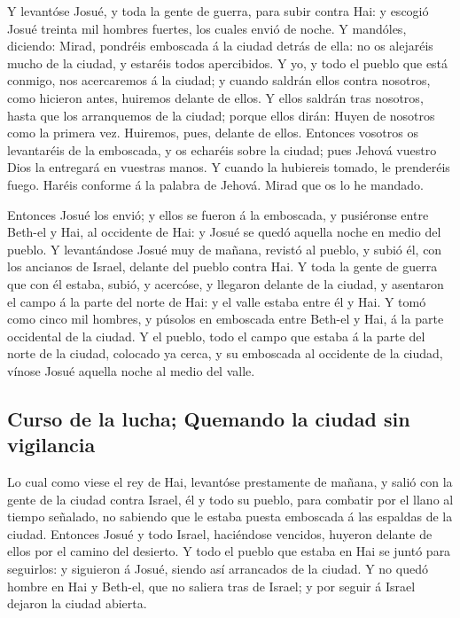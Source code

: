  Y levantóse Josué, y toda la gente de guerra, para subir
contra Hai: y escogió Josué treinta mil hombres fuertes, los cuales
envió de noche.  Y mandóles, diciendo: Mirad, pondréis
emboscada á la ciudad detrás de ella: no os alejaréis mucho de la
ciudad, y estaréis todos apercibidos.  Y yo, y todo el
pueblo que está conmigo, nos acercaremos á la ciudad; y cuando saldrán
ellos contra nosotros, como hicieron antes, huiremos delante de ellos.
 Y ellos saldrán tras nosotros, hasta que los arranquemos
de la ciudad; porque ellos dirán: Huyen de nosotros como la primera vez.
Huiremos, pues, delante de ellos.  Entonces vosotros os
levantaréis de la emboscada, y os echaréis sobre la ciudad; pues Jehová
vuestro Dios la entregará en vuestras manos.  Y cuando la
hubiereis tomado, le prenderéis fuego. Haréis conforme á la palabra de
Jehová. Mirad que os lo he mandado.

 Entonces Josué los envió; y ellos se fueron á la
emboscada, y pusiéronse entre Beth-el y Hai, al occidente de Hai: y
Josué se quedó aquella noche en medio del pueblo.  Y
levantándose Josué muy de mañana, revistó al pueblo, y subió él, con los
ancianos de Israel, delante del pueblo contra Hai.  Y
toda la gente de guerra que con él estaba, subió, y acercóse, y llegaron
delante de la ciudad, y asentaron el campo á la parte del norte de Hai:
y el valle estaba entre él y Hai.  Y tomó como cinco mil
hombres, y púsolos en emboscada entre Beth-el y Hai, á la parte
occidental de la ciudad.  Y el pueblo, todo el campo que
estaba á la parte del norte de la ciudad, colocado ya cerca, y su
emboscada al occidente de la ciudad, vínose Josué aquella noche al medio
del valle.

\hypertarget{curso-de-la-lucha-quemando-la-ciudad-sin-vigilancia}{%
\subsection{Curso de la lucha; Quemando la ciudad sin
vigilancia}\label{curso-de-la-lucha-quemando-la-ciudad-sin-vigilancia}}

 Lo cual como viese el rey de Hai, levantóse prestamente
de mañana, y salió con la gente de la ciudad contra Israel, él y todo su
pueblo, para combatir por el llano al tiempo señalado, no sabiendo que
le estaba puesta emboscada á las espaldas de la ciudad. 
Entonces Josué y todo Israel, haciéndose vencidos, huyeron delante de
ellos por el camino del desierto.  Y todo el pueblo que
estaba en Hai se juntó para seguirlos: y siguieron á Josué, siendo así
arrancados de la ciudad.  Y no quedó hombre en Hai y
Beth-el, que no saliera tras de Israel; y por seguir á Israel dejaron la
ciudad abierta.

